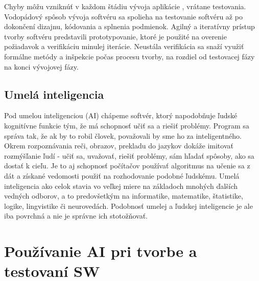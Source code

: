 \documentclass[10pt,twoside,slovak,a4paper]{article}
\begin{document}
 Chyby môžu vzniknúť v každom štádiu vývoja aplikácie \cite{testovanie}, vrátane testovania. Vodopádový spôsob vývoja softvéru \cite{CSEroadmap} sa spolieha na testovanie softvéru až po dokončení dizajnu, kódovania a splnenia podmienok. Agilný a iteratívny prístup tvorby softvéru predstavili prototypovanie, ktoré je použité na overenie požiadavok a verifikáciu minulej iterácie. Neustála verifikácia sa snaží využiť formálne metódy a inšpekcie počas procesu tvorby, na rozdiel od testovacej fázy na konci vývojovej fázy.
\subsection{Umelá inteligencia}\label{AI}

 Pod umelou inteligenciou (AI) chápeme softvér, ktorý napodobňuje ľudské kognitívne funkcie tým, že má schopnosť učiť sa a riešiť problémy. Program sa správa tak, že ak by to robil človek, považovali by sme ho za inteligentného. Okrem rozpoznávania reči, obrazov, prekladu do jazykov dokáže imitovať rozmýšľanie ľudí - učiť sa, uvažovať, riešiť problémy, sám hľadať spôsoby, ako sa dostať k cieľu. Je to aj schopnosť počítačov používať algoritmus na učenie sa z dát a získané vedomosti použiť na rozhodovanie podobné ľudskému. Umelá inteligencia ako celok stavia vo veľkej miere na základoch mnohých ďalších vedných odborov, a to predovšetkým na informatike, matematike, štatistike, logike, lingvistike či neurovedách. Podobnosť umelej a ľudskej inteligencie je ale iba povrchná a nie je správne ich stotožňovať.\cite{AIvMed}

\section{Používanie AI pri tvorbe a testovaní SW} \label{pouzitie AI pri SW}
\end{document}

